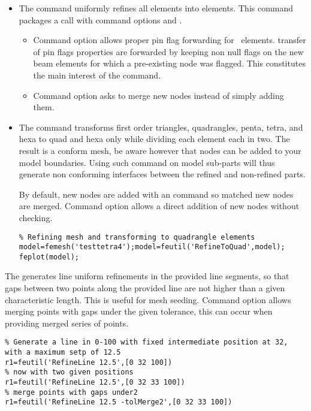 \begin{itemize}
\item The  command uniformly refines all \beam elements into  elements. This command packages a  call with command options  and . 
\begin{itemize}
\item Command option  allows proper pin flag forwarding for \beam\ elements. transfer of pin flags properties are forwarded by keeping non null flags on the new beam elements for which a pre-existing node was flagged. This constitutes the main interest of the command.
\item Command option  asks to merge new nodes instead of simply adding them.
\end{itemize}

\item The   command transforms first order triangles, quadrangles, penta, tetra, and hexa to quad and hexa only while dividing each element each in two. The result is a conform mesh, be aware however that nodes can be added to your model boundaries. Using such command on model sub-parts will thus generate non conforming interfaces between the refined and non-refined parts.

By default, new nodes are added with an  command so matched new nodes are merged. Command option  allows a direct addition of new nodes without checking.

\begin{verbatim}
% Refining mesh and transforming to quadrangle elements
model=femesh('testtetra4');model=feutil('RefineToQuad',model);
feplot(model);
\end{verbatim}%

\end{itemize}


The  generates line uniform refinements in the provided line segments, so that gaps between two points along the provided line are not higher than a given characteristic length. This is useful for mesh seeding.
Command option  allows merging points with gaps under the given tolerance, this can occur when providing merged series of points.

\begin{verbatim}
% Generate a line in 0-100 with fixed intermediate position at 32, with a maximum setp of 12.5
r1=feutil('RefineLine 12.5',[0 32 100])
% now with two given positions
r1=feutil('RefineLine 12.5',[0 32 33 100])
% merge points with gaps under2
r1=feutil('RefineLine 12.5 -tolMerge2',[0 32 33 100])
\end{verbatim}


